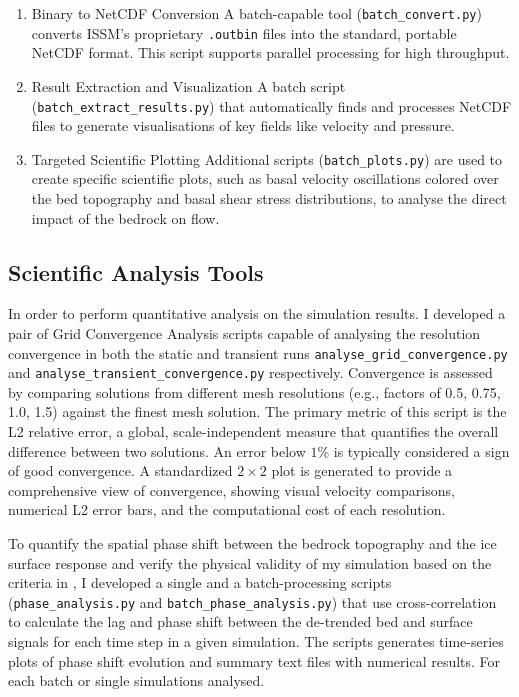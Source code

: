 \begin{enumerate}
\item{Binary to NetCDF Conversion} A batch-capable tool (\texttt{batch\_convert.py}) converts ISSM's proprietary \texttt{.outbin} files into the standard, portable NetCDF format. This script supports parallel processing for high throughput.
\item{Result Extraction and Visualization} A batch script (\texttt{batch\_extract\_results.py}) that automatically finds and processes NetCDF files to generate visualisations of key fields like velocity and pressure. 
\item{Targeted Scientific Plotting} Additional scripts (\texttt{batch\_plots.py}) are used to create specific scientific plots, such as basal velocity oscillations colored over the bed topography and basal shear stress distributions, to analyse the direct impact of the bedrock on flow.
\end{enumerate}

\subsection{Scientific Analysis Tools}

In order to  perform quantitative analysis on the simulation results. I developed a pair of Grid Convergence Analysis scripts capable of analysing the resolution convergence in both the static and transient runs \texttt{analyse\_grid\_convergence.py} and \texttt{analyse\_transient\_convergence.py} respectively. Convergence is assessed by comparing solutions from different mesh resolutions (e.g., factors of 0.5, 0.75, 1.0, 1.5) against the finest mesh solution. The primary metric of this script is the L2 relative error, a global, scale-independent measure that quantifies the overall difference between two solutions. An error below $1\%$ is typically considered a sign of good convergence. A standardized $2\times2$ plot is generated to provide a comprehensive view of convergence, showing visual velocity comparisons, numerical L2 error bars, and the computational cost of each resolution.

To quantify the spatial phase shift between the bedrock topography and the ice surface response and verify the physical validity of my simulation based on the criteria in \cite{Budd_1970}, 
I developed a single and a batch-processing scripts (\texttt{phase\_analysis.py} and \texttt{batch\_phase\_analysis.py}) that use cross-correlation to calculate the lag and phase shift between the de-trended bed and surface signals for each time step in a given simulation. The scripts generates time-series plots of phase shift evolution and summary text files with numerical results. For each batch or single simulations analysed.

